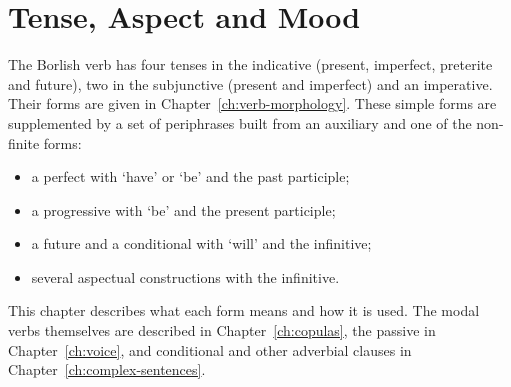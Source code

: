 \chapter{Tense, Aspect and Mood}\label{ch:tam}

The Borlish verb has four tenses in the indicative (present, imperfect, preterite and future), two in the subjunctive (present and imperfect) and an imperative. Their forms are given in Chapter~\ref{ch:verb-morphology}. These simple forms are supplemented by a set of periphrases built from an auxiliary and one of the non-finite forms:
\begin{itemize}
    \item a perfect with  `have' or  `be' and the past participle;
    \item a progressive with `be' and the present participle;
    \item a future and a conditional with  `will' and the infinitive;
    \item several aspectual constructions with the infinitive.
\end{itemize}
This chapter describes what each form means and how it is used. The modal verbs themselves are described in Chapter~\ref{ch:copulas}, the passive in Chapter~\ref{ch:voice}, and conditional and other adverbial clauses in Chapter~\ref{ch:complex-sentences}.

